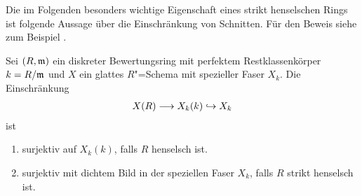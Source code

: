 Die im Folgenden besonders wichtige Eigenschaft eines strikt
henselschen Rings ist folgende Aussage über die Einschränkung von
Schnitten. Für den Beweis siehe zum Beispiel
\cite[Proposition~IV.6.4]{silverman2}.
\begin{Satz}
  \label{thm:eigstrikthenselsch}
  Sei $(R,\mathfrak{m})$ ein diskreter Bewertungsring mit perfektem
  Restklassenkörper $k=R/\mathfrak{m}$ und $X$ ein glattes $R$"=Schema mit
  spezieller Faser $X_k$.
  Die Einschränkung
  \begin{gather*}
    X(R)\longrightarrow X_k(k)\hookrightarrow X_k
  \end{gather*}
  ist
  \begin{enumerate}[label=(\alph*)]
  \item surjektiv auf $X_k(k)$, falls $R$ henselsch ist.
  \item surjektiv mit dichtem Bild in der speziellen Faser $X_k$,
    falls $R$ strikt henselsch ist.
  \end{enumerate}
\end{Satz}

